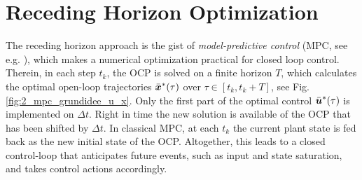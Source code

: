 \begin{center}
\begin{table}[h]
\noindent
{}
\caption{Comparison and combination of the approaches}
\label{tab:vergleichOpt}
\end{table}
\end{center}



\section{Receding Horizon Optimization}\label{S:57.5}

The receding horizon approach is the gist of \emph{model-predictive control} (MPC, see e.g. \cite{rawlings2000tutorial}), which makes a numerical optimization practical for closed loop control. Therein, in each step $t_k$, the OCP is solved on a finite horizon $T$, which calculates the optimal open-loop trajectories $\bar{\boldsymbol{x}}^\ast(\tau)$ over $\tau \in [t_k,t_k+T]$, see Fig.\,\ref{fig:2_mpc_grundidee_u_x}. Only the first part of the optimal control $\bar{\boldsymbol{u}}^\ast(\tau)$ is implemented on $\Delta t$. Right in time the new solution is available of the OCP that has been shifted by $\Delta t$. In classical MPC, at each $t_k$ the current plant state is fed back as the new initial state of the OCP. Altogether, this leads to a closed control-loop that anticipates future events, such as input and state saturation, and takes control actions accordingly. 

